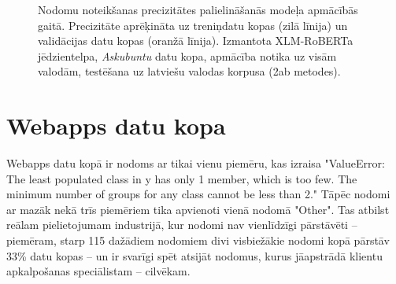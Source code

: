 \begin{figure}[h] 
   \centering
   \caption{Nodomu noteikšanas precizitātes palielināšanās modeļa apmācībās gaitā. Precizitāte aprēķināta uz treniņdatu kopas (zilā līnija) un validācijas datu kopas (oranžā līnija). Izmantota XLM-RoBERTa jēdzientelpa, \textit{Askubuntu} datu kopa, apmācība notika uz visām valodām, testēšana uz latviešu valodas korpusa (2ab metodes).} 
   \label{fig:askubuntu-xlm-all}
\end{figure}



\section{Webapps datu kopa}


Webapps datu kopā ir nodoms ar tikai vienu piemēru, kas izraisa "ValueError: The least populated class in y has only 1 member, which is too few. The minimum number of groups for any class cannot be less than 2." Tāpēc nodomi ar mazāk nekā trīs piemēriem tika apvienoti vienā nodomā "Other". Tas atbilst reālam pielietojumam industrijā, kur nodomi nav vienlīdzīgi pārstāvēti  -- piemēram, starp 115 dažādiem nodomiem divi visbiežākie nodomi kopā pārstāv 33\% datu kopas \cite{paikens2020} -- un ir svarīgi spēt atsijāt nodomus, kurus jāapstrādā klientu apkalpošanas speciālistam -- cilvēkam.





